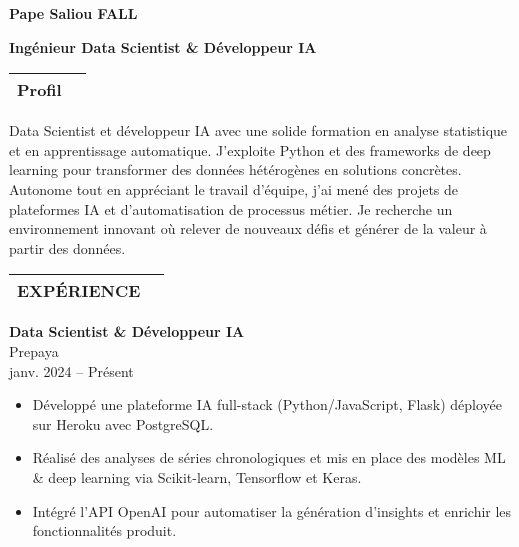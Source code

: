 \documentclass{article}
\makeatletter
\newcommand{\cvsection}[1]{%
  \setlength{\arrayrulewidth}{2pt}
  \begin{tabular}{@{}ll}
  \textbf{\Large #1}\\ \hline
  \end{tabular}\vspace{4pt}
}
\newcommand*{\ClipSep}{0.4cm}
\makeatother
\begin{document}
\pagestyle{empty}
\begin{paracol}{2}

\begin{minipage}{0.7\linewidth}
{\LARGE\textbf{Pape Saliou FALL}}

\bigskip
{\large\textbf{Ingénieur Data Scientist \& Développeur IA}}
\end{minipage}\hfill
\begin{minipage}{0.18\linewidth}
\end{minipage}

\cvsection{Profil}
Data Scientist et développeur IA avec une solide formation en analyse statistique et en apprentissage automatique. J’exploite Python et des frameworks de deep learning pour transformer des données hétérogènes en solutions concrètes. Autonome tout en appréciant le travail d’équipe, j’ai mené des projets de plateformes IA et d’automatisation de processus métier. Je recherche un environnement innovant où relever de nouveaux défis et générer de la valeur à partir des données.

\cvsection{EXPÉRIENCE}

\colorbox{maincolor}{%
  \begin{minipage}{\linewidth}
    \textbf{Data Scientist \& Développeur IA} \\ Prepaya \\ janv. 2024 – Présent
    \begin{itemize}
      \item Développé une plateforme IA full-stack (Python/JavaScript, Flask) déployée sur Heroku avec PostgreSQL. \item Réalisé des analyses de séries chronologiques et mis en place des modèles ML \& deep learning via Scikit-learn, Tensorflow et Keras. \item Intégré l’API OpenAI pour automatiser la génération d’insights et enrichir les fonctionnalités produit.
    \end{itemize}
  \end{minipage}}


\end{paracol}
\end{document}
